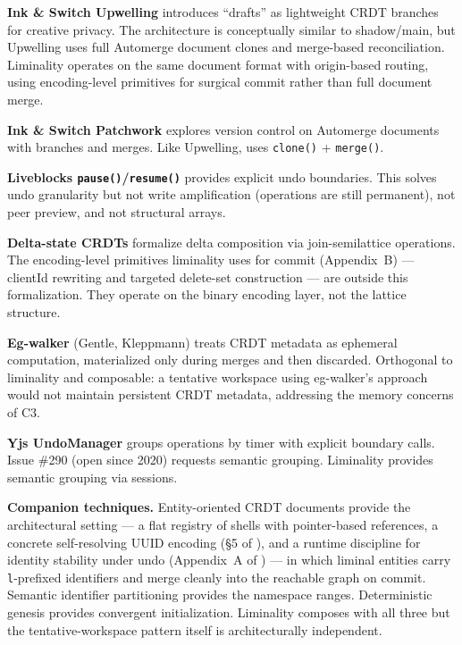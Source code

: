 \textbf{Ink \& Switch Upwelling} \cite{upwelling} introduces ``drafts'' as lightweight CRDT branches for creative privacy. The architecture is conceptually similar to shadow/main, but Upwelling uses full Automerge document clones and merge-based reconciliation. Liminality operates on the same document format with origin-based routing, using encoding-level primitives for surgical commit rather than full document merge.

\textbf{Ink \& Switch Patchwork} \cite{patchwork} explores version control on Automerge documents with branches and merges. Like Upwelling, uses \texttt{clone()} + \texttt{merge()}.

\textbf{Liveblocks \texttt{pause()}/\texttt{resume()}} \cite{liveblocks:undo} provides explicit undo boundaries. This solves undo granularity but not write amplification (operations are still permanent), not peer preview, and not structural arrays.

\textbf{Delta-state CRDTs} \cite{almeida2018delta} formalize delta composition via join-semilattice operations. The encoding-level primitives liminality uses for commit (Appendix~B) --- clientId rewriting and targeted delete-set construction --- are outside this formalization. They operate on the binary encoding layer, not the lattice structure.

\textbf{Eg-walker} \cite{gentle2025egwalker} (Gentle, Kleppmann) treats CRDT metadata as ephemeral computation, materialized only during merges and then discarded. Orthogonal to liminality and composable: a tentative workspace using eg-walker's approach would not maintain persistent CRDT metadata, addressing the memory concerns of C3.

\textbf{Yjs UndoManager} \cite{yjs:undomanager} groups operations by timer with explicit boundary calls. Issue \#290 (open since 2020) requests semantic grouping. Liminality provides semantic grouping via sessions.

\textbf{Companion techniques.} Entity-oriented CRDT documents \cite{plexus:arch} provide the architectural setting --- a flat registry of shells with pointer-based references, a concrete self-resolving UUID encoding (\S5 of \cite{plexus:arch}), and a runtime discipline for identity stability under undo (Appendix~A of \cite{plexus:arch}) --- in which liminal entities carry \texttt{l}-prefixed identifiers and merge cleanly into the reachable graph on commit. Semantic identifier partitioning \cite{plexus:partitioning} provides the namespace ranges. Deterministic genesis \cite{plexus:genesis} provides convergent initialization. Liminality composes with all three but the tentative-workspace pattern itself is architecturally independent.

